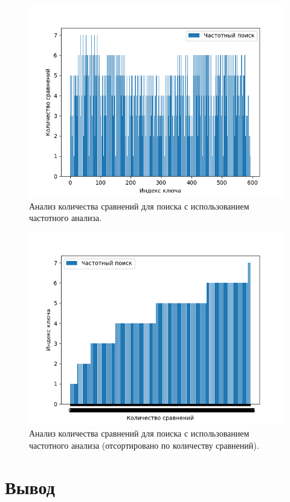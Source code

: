 \documentclass[12pt]{report}
\begin{document}
\begin{figure}[H]
	\centering
	\includegraphics[scale=0.8]{clust_search.png}
	\caption{Анализ количества сравнений для поиска с использованием частотного анализа.}
	\label{fig:mpr}
\end{figure}

\begin{figure}[H]
	\centering
	\includegraphics[scale=0.8]{clust_search_sorted.png}
	\caption{Анализ количества сравнений для поиска с использованием частотного анализа (отсортировано по количеству сравнений).}
	\label{fig:mpr}
\end{figure}

\section*{Вывод}
\end{document}
